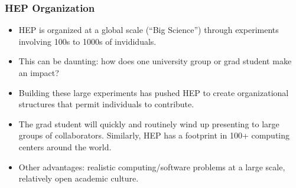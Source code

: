 \begin{frame}
\frametitle{HEP Organization}

\begin{itemize}
\item HEP is organized at a global scale (``Big Science'') through experiments involving 100s to 1000s of invididuals. 
\item This can be daunting: how does one university group or grad student make an impact?
\item Building these large experiments has pushed HEP to create organizational structures that permit individuals to contribute.
\item The grad student will quickly and routinely wind up presenting to large groups of collaborators. Similarly, HEP has a footprint in 100+ computing centers around the world.
\item Other advantages: realistic computing/software problems at a large scale, relatively open academic culture.
\end{itemize}

\end{frame}


